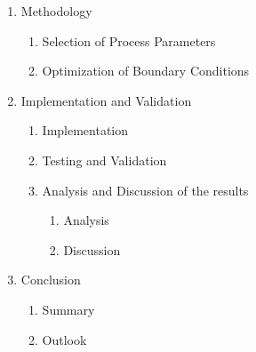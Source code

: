 \documentclass[ZLstudentexpose%
              ,optBiber%
              ,optEnglish%
              ,10pt
              ]{ZLlatex}%
\begin{document}
\begin{enumerate}
	\item Methodology
	\begin{enumerate}
		\item Selection of Process Parameters
		\item Optimization of Boundary Conditions
	\end{enumerate}
	\item Implementation and Validation 
		\begin{enumerate}
			\item Implementation
			\item Testing and Validation 
			\item Analysis and Discussion of the results
			\begin{enumerate}
				\item Analysis
				\item Discussion
			\end{enumerate}
		\end{enumerate}
	\item Conclusion
		\begin{enumerate}
			\item Summary
			\item Outlook
		\end{enumerate}
	
\end{enumerate} 
%
\end{document}
